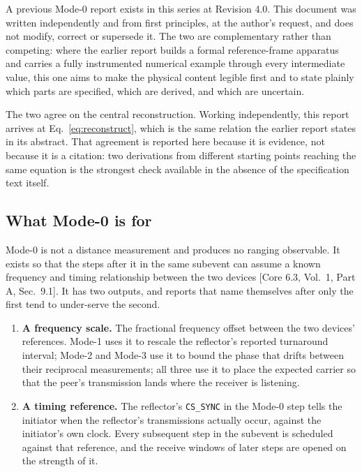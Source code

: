 \documentclass[11pt,a4paper]{article}
\newcommand{\code}[1]{\texttt{\small #1}}
\newcommand{\core}[1]{\textcolor{rulegrey}{\small[Core 6.3, #1]}}
\begin{document}
A previous Mode-0 report exists in this series at Revision 4.0. This document was written
independently and from first principles, at the author's request, and does not modify, correct or
supersede it. The two are complementary rather than competing: where the earlier report builds a
formal reference-frame apparatus and carries a fully instrumented numerical example through every
intermediate value, this one aims to make the physical content legible first and to state plainly
which parts are specified, which are derived, and which are uncertain.

The two agree on the central reconstruction. Working independently, this report arrives at
Eq.~\eqref{eq:reconstruct}, which is the same relation the earlier report states in its abstract.
That agreement is reported here because it is evidence, not because it is a citation: two derivations
from different starting points reaching the same equation is the strongest check available in the
absence of the specification text itself.

\subsection{What Mode-0 is for}

Mode-0 is not a distance measurement and produces no ranging observable. It exists so that the steps
after it in the same subevent can assume a known frequency and timing relationship between the two
devices \core{Vol.\ 1, Part A, Sec.\ 9.1}. It has two outputs, and reports that name themselves after
only the first tend to under-serve the second.

\begin{enumerate}[leftmargin=1.6em,itemsep=2pt]
  \item \textbf{A frequency scale.} The fractional frequency offset between the two devices'
    references. Mode-1 uses it to rescale the reflector's reported turnaround interval; Mode-2 and
    Mode-3 use it to bound the phase that drifts between their reciprocal measurements; all three use
    it to place the expected carrier so that the peer's transmission lands where the receiver is
    listening.
  \item \textbf{A timing reference.} The reflector's \code{CS\_SYNC} in the Mode-0 step tells the
    initiator when the reflector's transmissions actually occur, against the initiator's own clock.
    Every subsequent step in the subevent is scheduled against that reference, and the receive windows
    of later steps are opened on the strength of it.
\end{enumerate}
\end{document}
